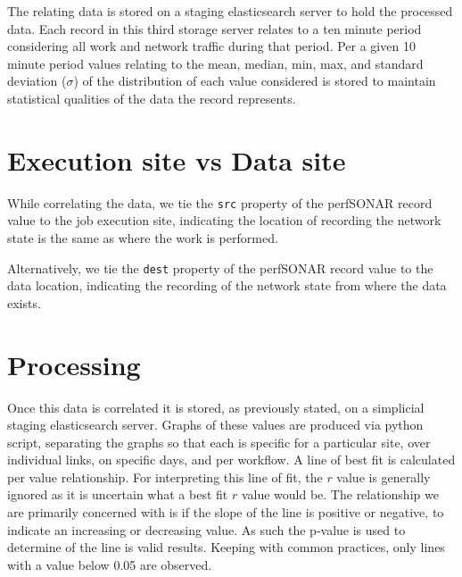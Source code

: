 \documentclass[print,ms]{nuthesis}
\begin{document}
The relating data is stored on a staging elasticsearch server to hold the processed data. Each record in this third storage server relates to a ten minute period considering all work and network traffic during that period. Per a given 10 minute period values relating to the mean, median, min, max, and standard deviation ($\sigma$) of the distribution of each value considered is stored to maintain statistical qualities of the data the record represents.
\section{Execution site vs Data site}
While correlating the data, we tie the \texttt{src} property of the perfSONAR record value to the job execution site, indicating the location of recording the network state is the same as where the work is performed.

Alternatively, we tie the \texttt{dest} property of the perfSONAR record value to the data location, indicating the recording of the network state from where the data exists.
\section{Processing}
Once this data is correlated it is stored, as previously stated, on a simplicial staging elasticsearch server. Graphs of these values are produced via python script, separating the graphs so that each is specific for a particular site, over individual links, on specific days, and per workflow. A line of best fit is calculated per value relationship. For interpreting this line of fit, the $r$ value is generally ignored as it is uncertain what a best fit $r$ value would be. The relationship we are primarily concerned with is if the slope of the line is positive or negative, to indicate an increasing or decreasing value. As such the p-value is used to determine of the line is valid results. Keeping with common practices, only lines with a value below 0.05 are observed.
\end{document}
